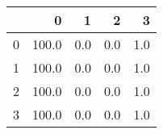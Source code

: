 \begin{tabular}{lrrrr}
\toprule
{} &      0 &    1 &    2 &    3 \\
\midrule
0 &  100.0 &  0.0 &  0.0 &  1.0 \\
1 &  100.0 &  0.0 &  0.0 &  1.0 \\
2 &  100.0 &  0.0 &  0.0 &  1.0 \\
3 &  100.0 &  0.0 &  0.0 &  1.0 \\
\bottomrule
\end{tabular}
